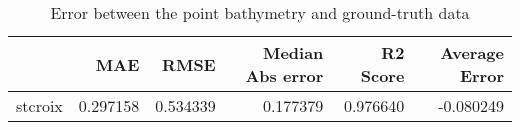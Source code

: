 \begin{table}[h!]
\caption{Error between the point bathymetry and ground-truth data}
\label{tab:stcroix_lidar_error}
\begin{tabular}{lrrrrr}
\toprule
 & MAE & RMSE & Median Abs error & R2 Score & Average Error \\
\midrule
stcroix & 0.297158 & 0.534339 & 0.177379 & 0.976640 & -0.080249 \\
\bottomrule
\end{tabular}
\end{table}
